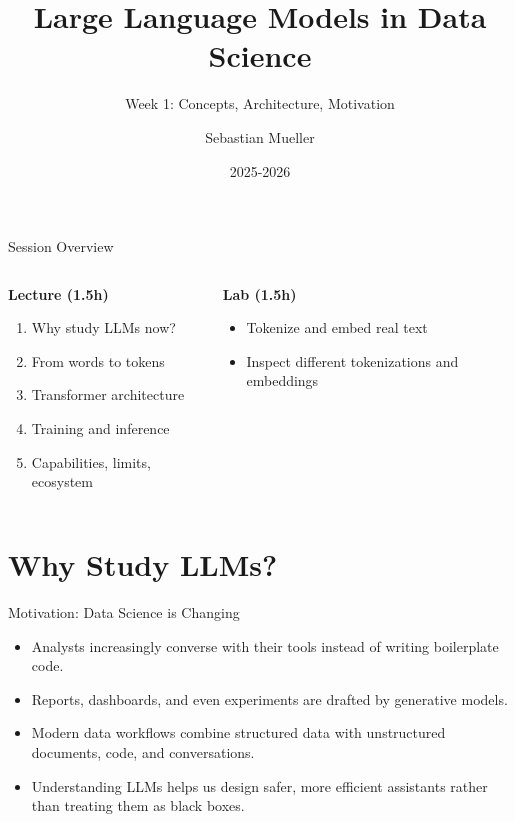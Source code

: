 \documentclass[aspectratio=169]{beamer}
\title{Large Language Models in Data Science}
\subtitle{Week 1: Concepts, Architecture, Motivation}
\author{Sebastian Mueller}
\institute{Aix-Marseille Universit\'e}
\date{2025-2026}
\begin{document}
\begin{frame}[plain]
  \titlepage
\end{frame}

\begin{frame}{Session Overview}
  \begin{columns}[T,onlytextwidth]
    \begin{column}{0.55\linewidth}
      \textbf{Lecture (1.5h)}
      \begin{enumerate}
        \item Why study LLMs now?
        \item From words to tokens
        \item Transformer architecture
        \item Training and inference
        \item Capabilities, limits, ecosystem
      \end{enumerate}
    \end{column}
    \begin{column}{0.4\linewidth}
      \textbf{Lab (1.5h)}
      \begin{itemize}
        \item Tokenize and embed real text
        \item Inspect different tokenizations and embeddings
      \end{itemize}
    \end{column}
  \end{columns}
\end{frame}

\section{Why Study LLMs?}

\begin{frame}{Motivation: Data Science is Changing}
  \begin{itemize}
    \item Analysts increasingly converse with their tools instead of writing boilerplate code.
    \item Reports, dashboards, and even experiments are drafted by generative models.
    \item Modern data workflows combine structured data with unstructured documents, code, and conversations.
    \item Understanding LLMs helps us design safer, more efficient assistants rather than treating them as black boxes.
  \end{itemize}
\end{frame}
\end{document}

